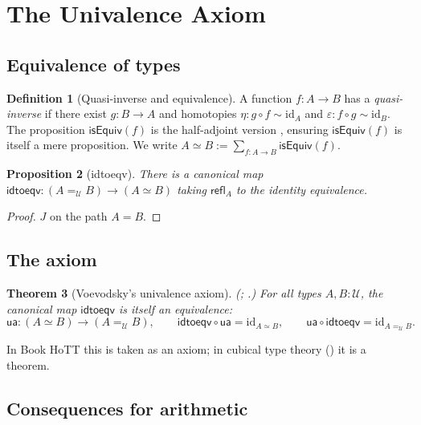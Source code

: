 \documentclass[12pt]{article}
\newtheorem{theorem}{Theorem}[section]
\newtheorem{proposition}[theorem]{Proposition}
\theoremstyle{definition}
\newtheorem{definition}[theorem]{Definition}
\theoremstyle{remark}
\newcommand{\U}{\mathcal{U}}
\newcommand{\refl}{\mathsf{refl}}
\newcommand{\ua}{\mathsf{ua}}
\newcommand{\idtoeqv}{\mathsf{idtoeqv}}
\newcommand{\eqv}{\simeq}
\begin{document}
\section{The Univalence Axiom}
\label{sec:univalence}

\subsection{Equivalence of types}

\begin{definition}[Quasi-inverse and equivalence]
\label{def:equiv}
A function $f : A \to B$ has a \emph{quasi-inverse} if there exist
$g : B \to A$ and homotopies $\eta : g \circ f \sim \mathrm{id}_A$ and
$\varepsilon : f \circ g \sim \mathrm{id}_B$. The proposition
$\mathsf{isEquiv}(f)$ is the half-adjoint version
\cite[\S4.2]{HoTTBook}, ensuring $\mathsf{isEquiv}(f)$ is itself a mere
proposition. We write $A \eqv B := \sum_{f : A \to B} \mathsf{isEquiv}(f)$.
\end{definition}

\begin{proposition}[idtoeqv]
\label{prop:idtoeqv}
There is a canonical map
$\idtoeqv : (A =_\U B) \to (A \eqv B)$ taking $\refl_A$ to the identity
equivalence.
\end{proposition}

\begin{proof}
$J$ on the path $A = B$.
\end{proof}

\subsection{The axiom}

\begin{theorem}[Voevodsky's univalence axiom]
\label{thm:univalence}
\textup{(\cite{Voevodsky}; \cite[Axiom 2.10.3]{HoTTBook}.)}
For all types $A, B : \U$, the canonical map $\idtoeqv$ is itself an
equivalence:
\[
\ua : (A \eqv B) \to (A =_\U B), \qquad
\idtoeqv \circ \ua = \mathrm{id}_{A \eqv B}, \qquad
\ua \circ \idtoeqv = \mathrm{id}_{A =_\U B}.
\]
\end{theorem}

In Book HoTT this is taken as an axiom; in cubical type theory
() it is a theorem.

\subsection{Consequences for arithmetic}
\end{document}

